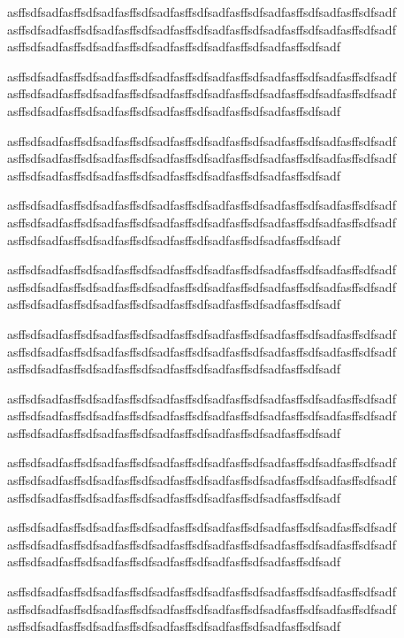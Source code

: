\documentclass[MTech]{iitmdiss}
\begin{document}
asffsdfsadfasffsdfsadfasffsdfsadfasffsdfsadfasffsdfsadfasffsdfsadfasffsdfsadf
asffsdfsadfasffsdfsadfasffsdfsadfasffsdfsadfasffsdfsadfasffsdfsadfasffsdfsadf
asffsdfsadfasffsdfsadfasffsdfsadfasffsdfsadfasffsdfsadfasffsdfsadf


asffsdfsadfasffsdfsadfasffsdfsadfasffsdfsadfasffsdfsadfasffsdfsadfasffsdfsadf
asffsdfsadfasffsdfsadfasffsdfsadfasffsdfsadfasffsdfsadfasffsdfsadfasffsdfsadf
asffsdfsadfasffsdfsadfasffsdfsadfasffsdfsadfasffsdfsadfasffsdfsadf

asffsdfsadfasffsdfsadfasffsdfsadfasffsdfsadfasffsdfsadfasffsdfsadfasffsdfsadf
asffsdfsadfasffsdfsadfasffsdfsadfasffsdfsadfasffsdfsadfasffsdfsadfasffsdfsadf
asffsdfsadfasffsdfsadfasffsdfsadfasffsdfsadfasffsdfsadfasffsdfsadf


asffsdfsadfasffsdfsadfasffsdfsadfasffsdfsadfasffsdfsadfasffsdfsadfasffsdfsadf
asffsdfsadfasffsdfsadfasffsdfsadfasffsdfsadfasffsdfsadfasffsdfsadfasffsdfsadf
asffsdfsadfasffsdfsadfasffsdfsadfasffsdfsadfasffsdfsadfasffsdfsadf


asffsdfsadfasffsdfsadfasffsdfsadfasffsdfsadfasffsdfsadfasffsdfsadfasffsdfsadf
asffsdfsadfasffsdfsadfasffsdfsadfasffsdfsadfasffsdfsadfasffsdfsadfasffsdfsadf
asffsdfsadfasffsdfsadfasffsdfsadfasffsdfsadfasffsdfsadfasffsdfsadf


asffsdfsadfasffsdfsadfasffsdfsadfasffsdfsadfasffsdfsadfasffsdfsadfasffsdfsadf
asffsdfsadfasffsdfsadfasffsdfsadfasffsdfsadfasffsdfsadfasffsdfsadfasffsdfsadf
asffsdfsadfasffsdfsadfasffsdfsadfasffsdfsadfasffsdfsadfasffsdfsadf

asffsdfsadfasffsdfsadfasffsdfsadfasffsdfsadfasffsdfsadfasffsdfsadfasffsdfsadf
asffsdfsadfasffsdfsadfasffsdfsadfasffsdfsadfasffsdfsadfasffsdfsadfasffsdfsadf
asffsdfsadfasffsdfsadfasffsdfsadfasffsdfsadfasffsdfsadfasffsdfsadf


asffsdfsadfasffsdfsadfasffsdfsadfasffsdfsadfasffsdfsadfasffsdfsadfasffsdfsadf
asffsdfsadfasffsdfsadfasffsdfsadfasffsdfsadfasffsdfsadfasffsdfsadfasffsdfsadf
asffsdfsadfasffsdfsadfasffsdfsadfasffsdfsadfasffsdfsadfasffsdfsadf

asffsdfsadfasffsdfsadfasffsdfsadfasffsdfsadfasffsdfsadfasffsdfsadfasffsdfsadf
asffsdfsadfasffsdfsadfasffsdfsadfasffsdfsadfasffsdfsadfasffsdfsadfasffsdfsadf
asffsdfsadfasffsdfsadfasffsdfsadfasffsdfsadfasffsdfsadfasffsdfsadf


asffsdfsadfasffsdfsadfasffsdfsadfasffsdfsadfasffsdfsadfasffsdfsadfasffsdfsadf
asffsdfsadfasffsdfsadfasffsdfsadfasffsdfsadfasffsdfsadfasffsdfsadfasffsdfsadf
asffsdfsadfasffsdfsadfasffsdfsadfasffsdfsadfasffsdfsadfasffsdfsadf
\end{document}
